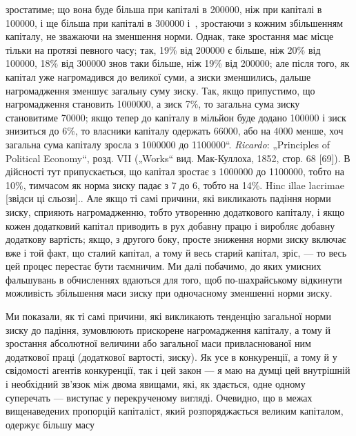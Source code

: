 {зростатиме; що вона буде більша при капіталі в \num{200000},
ніж при капіталі в \num{100000}, і ще більша при капіталі
в \num{300000} і~, зростаючи з кожним збільшенням капіталу,
не зважаючи на зменшення норми. Однак, таке зростання має місце тільки на
протязі певного часу; так, 19\% від \num{200000} є більше, ніж 20\%
від \num{100000}, 18\% від \num{300000} знов таки
більше, ніж 19\% від \num{200000}; але після того, як капітал уже
нагромадився до великої суми, а зиски зменшились, дальше нагромадження
зменшує загальну суму зиску. Так, якщо припустимо, що нагромадження
становить \num{1000000}, а зиск 7\%, то загальна сума зиску становитиме
\num{70000}; якщо тепер до капіталу в мільйон буде
додано \num{100000} і зиск знизиться до 6\%, то власники капіталу
одержать \num{66000}, або на 4000 менше, хоч
загальна сума капіталу зросла з \num{1000000} до \num{1100000}“. \emph{Ricardo}: „Principles of Political Economy“, розд. VII („Works“
вид. Мак-Куллоха, 1852, стор. 68 [69]). В дійсності тут припускається, що капітал
зростає з \num{1000000} до \num{1100000}, тобто на 10\%, тимчасом як норма зиску
падає з 7 до 6, тобто на 14\%. Hinc illae lacrimae [звідси ці сльози].}. Але
якщо ті самі причини, які викликають падіння норми зиску,
сприяють нагромадженню, тобто утворенню додаткового капіталу,
і якщо кожен додатковий капітал приводить в рух добавну
працю і виробляє добавну додаткову вартість; якщо, з другого
боку, просте зниження норми зиску включає вже і той
факт, що сталий капітал, а тому й весь старий капітал, зріс, —
то весь цей процес перестає бути таємничим. Ми далі побачимо,
до яких умисних фальшувань в обчисленнях вдаються
для того, щоб по-шахрайському відкинути можливість збільшення
маси зиску при одночасному зменшенні норми зиску.

Ми показали, як ті самі причини, які викликають тенденцію
загальної норми зиску до падіння, зумовлюють прискорене нагромадження
капіталу, а тому й зростання абсолютної величини або
загальної маси привласнюваної ним додаткової праці (додаткової
вартості, зиску). Як усе в конкуренції, а тому й у свідомості
агентів конкуренції, так і цей закон — я маю на думці цей внутрішній
і необхідний зв’язок між двома явищами, які, як здається,
одне одному суперечать — виступає у перекрученому вигляді.
Очевидно, що в межах вищенаведених пропорцій капіталіст,
який розпоряджається великим капіталом, одержує більшу масу
\parbreak{}  %
